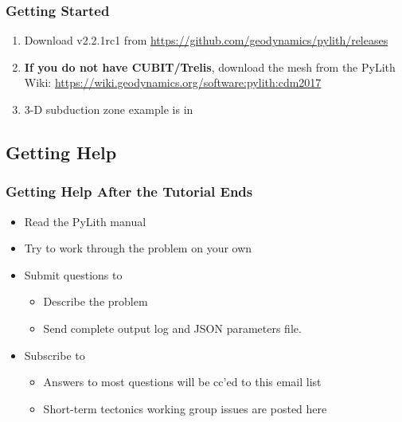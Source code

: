 \documentclass[aspectratio=169]{beamer}
\begin{document}
\begin{frame}
  \frametitle{Getting Started}
  
  \begin{enumerate}
  \item Download v2.2.1rc1 from
    \url{https://github.com/geodynamics/pylith/releases}
  \item {\bf If you do not have CUBIT/Trelis}, download the mesh from the
    PyLith Wiki:
    \url{https://wiki.geodynamics.org/software:pylith:cdm2017}
  \item 3-D subduction zone example is in 
  \end{enumerate}  

\end{frame}


\subsection{Getting Help}

\begin{frame}
  \frametitle{Getting Help After the Tutorial Ends}
  \summary{}
 
  \begin{itemize}
  \item Read the PyLith manual
  \item Try to work through the problem on your own
  \item Submit questions to 
    \begin{itemize}
    \item Describe the problem
    \item Send complete output log and JSON parameters file.
   \end{itemize}
  \item Subscribe to 
    \begin{itemize}
    \item Answers to most questions will be cc'ed to this email list
    \item Short-term tectonics working group issues are posted here
    \end{itemize}
  \end{itemize}

\end{frame}
\end{document}
